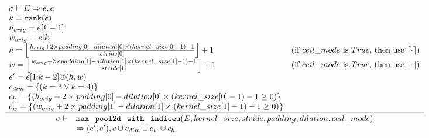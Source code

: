 \documentclass{article}
\begin{document}
\begin{align*}
  \frac
  {
    \begin{array}{ll}
      \sigma \vdash E \Rightarrow e, c \\
      k = \mathtt{rank(}e\mathtt{)} \\
      h_{orig} = e[k-1] \\
      w_{orig} = e[k] \\
      h = \left\lfloor \frac{h_{orig} + 2 \times padding \mathtt{[}0\mathtt{]} - dilation \mathtt{[}0\mathtt{]}
        \times (kernel\_size \mathtt{[}0\mathtt{]} - 1) - 1}{stride \mathtt{[}0\mathtt{]}} \right\rfloor + 1 &
        \text{(if $ceil\_mode$ is $True$, then use $\lceil \cdot \rceil$)}\\
      w = \left\lfloor \frac{w_{orig} + 2 \times padding \mathtt{[}1\mathtt{]} - dilation \mathtt{[}1\mathtt{]}
        \times (kernel\_size \mathtt{[}1\mathtt{]} - 1) - 1}{stride \mathtt{[}1\mathtt{]}} \right\rfloor + 1 &
        \text{(if $ceil\_mode$ is $True$, then use $\lceil \cdot \rceil$)}\\
      e' = e\mathtt{[}1\mathtt{:}k-2\mathtt{]} \mathtt{@} (h, w) \\
      c_{dim} = \{ (k = 3 \lor k = 4) \} \\
      c_h = \{ (h_{orig} + 2 \times padding \mathtt{[}0\mathtt{]} - dilation \mathtt{[}0\mathtt{]}
        \times (kernel\_size \mathtt{[}0\mathtt{]} - 1) - 1 \geq 0) \} \\
      c_w = \{ (w_{orig} + 2 \times padding \mathtt{[}1\mathtt{]} - dilation \mathtt{[}1\mathtt{]}
        \times (kernel\_size \mathtt{[}1\mathtt{]} - 1) - 1 \geq 0) \} \\
    \end{array}
  }
  {
    \begin{array}{rl}
      \sigma \vdash & \mathtt{max\_pool2d\_with\_indices(}E, kernel\_size, stride, padding,
        dilation, ceil\_mode\mathtt{)} \\
      & \Rightarrow (e', e'), c \cup c_{dim} \cup c_w \cup c_h 
    \end{array}
  }
\end{align*}
\end{document}
